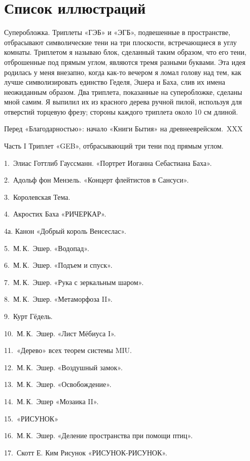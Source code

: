 \documentclass[../main.tex]{subfiles}
\begin{document}

\chapter{Список иллюстраций}

Суперобложка. Триплеты «ГЭБ» и «ЭГБ», подвешенные в пространстве, отбрасывают символические тени на три плоскости, встречающиеся в углу комнаты. Триплетом я называю блок, сделанный таким образом, что его тени, отброшенные под прямым углом, являются тремя разными буквами. Эта идея родилась у меня внезапно, когда как-то вечером я ломал голову над тем, как лучше символизировать единство Геделя, Эшера и Баха, слив их имена неожиданным образом. Два триплета, показанные на суперобложке, сделаны мной самим. Я выпилил их из красного дерева ручной пилой, используя для отверстий торцевую фрезу; стороны каждого триплета около 10 см длиной.

Перед «Благодарностью»: начало «Книги Бытия» на древнееврейском.~XXX

Часть I Триплет «GEB», отбрасывающий три тени под прямым углом.

1.~Элиас Готтлиб Гауссманн. «Портрет Иоганна Себастиана Баха».

2.~Адольф фон Мензель. «Концерт флейтистов в Сансуси».

3.~Королевская Тема.

4.~Акростих Баха «РИЧЕРКАР».

4а. Канон «Добрый король Венсеслас».

5.~М.\,К.~Эшер. «Водопад».

6.~М.\,К.~Эшер. «Подъем и спуск».

7.~М.\,К.~Эшер. «Рука с зеркальным шаром».

8.~М.\,К.~Эшер. «Метаморфоза II».

9.~Курт Гёдель.

10.~М.\,К.~Эшер. «Лист Мёбиуса I».

11.~«Дерево» всех теорем системы MIU.

12.~М.\,К.~Эшер. «Воздушный замок».

13.~М.\,К.~Эшер. «Освобождение».

14.~М.\,К.~Эшер «Мозаика II».

15.~«РИСУНОК»

16.~М.\,К.~Эшер. «Деление пространства при помощи птиц».

17.~Скотт Е. Ким Рисунок «РИСУНОК-РИСУНОК».
\end{document}
